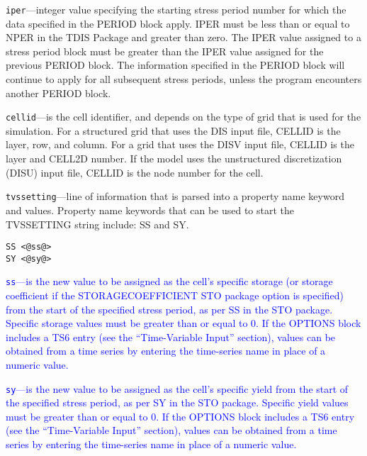\begin{description}
\item \texttt{iper}---integer value specifying the starting stress period number for which the data specified in the PERIOD block apply.  IPER must be less than or equal to NPER in the TDIS Package and greater than zero.  The IPER value assigned to a stress period block must be greater than the IPER value assigned for the previous PERIOD block.  The information specified in the PERIOD block will continue to apply for all subsequent stress periods, unless the program encounters another PERIOD block.

\item \texttt{cellid}---is the cell identifier, and depends on the type of grid that is used for the simulation.  For a structured grid that uses the DIS input file, CELLID is the layer, row, and column.   For a grid that uses the DISV input file, CELLID is the layer and CELL2D number.  If the model uses the unstructured discretization (DISU) input file, CELLID is the node number for the cell.

\item \texttt{tvssetting}---line of information that is parsed into a property name keyword and values.  Property name keywords that can be used to start the TVSSETTING string include: SS and SY.

\begin{lstlisting}[style=blockdefinition]
SS <@ss@>
SY <@sy@>
\end{lstlisting}

\item \textcolor{blue}{\texttt{ss}---is the new value to be assigned as the cell's specific storage (or storage coefficient if the STORAGECOEFFICIENT STO package option is specified) from the start of the specified stress period, as per SS in the STO package.  Specific storage values must be greater than or equal to 0.  If the OPTIONS block includes a TS6 entry (see the ``Time-Variable Input'' section), values can be obtained from a time series by entering the time-series name in place of a numeric value.}

\item \textcolor{blue}{\texttt{sy}---is the new value to be assigned as the cell's specific yield from the start of the specified stress period, as per SY in the STO package.  Specific yield values must be greater than or equal to 0.  If the OPTIONS block includes a TS6 entry (see the ``Time-Variable Input'' section), values can be obtained from a time series by entering the time-series name in place of a numeric value.}

\end{description}

